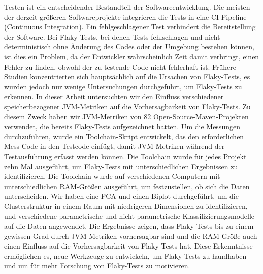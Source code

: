 \documentclass{seal_thesis}
\begin{document}
\begin{zusammenfassung}
Testen ist ein entscheidender Bestandteil der Softwareentwicklung. Die meisten der derzeit größeren Softwareprojekte integrieren die Tests in eine CI-Pipeline (Continuous Integration). Ein fehlgeschlagener Test verhindert die Bereitstellung der Software. Bei Flaky-Tests, bei denen Tests fehlschlagen und nicht deterministisch ohne Änderung des Codes oder der Umgebung bestehen können, ist dies ein Problem, da der Entwickler wahrscheinlich Zeit damit verbringt, einen Fehler zu finden, obwohl der zu testende Code nicht fehlerhaft ist. Frühere Studien konzentrierten sich hauptsächlich auf die Ursachen von Flaky-Tests, es wurden jedoch nur wenige Untersuchungen durchgeführt, um Flaky-Tests zu erkennen. In dieser Arbeit untersuchten wir den Einfluss verschiedener speicherbezogener JVM-Metriken auf die Vorhersagbarkeit von Flaky-Tests. Zu diesem Zweck haben wir JVM-Metriken von 82 Open-Source-Maven-Projekten verwendet, die bereits Flaky-Tests aufgezeichnet hatten. Um die Messungen durchzuführen, wurde ein Toolchain-Skript entwickelt, das den erforderlichen Mess-Code in den Testcode einfügt, damit JVM-Metriken während der Testausführung erfasst werden können. Die Toolchain wurde für jedes Projekt zehn Mal ausgeführt, um Flaky-Tests mit unterschiedlichen Ergebnissen zu identifizieren. Die Toolchain wurde auf verschiedenen Computern mit unterschiedlichen RAM-Größen ausgeführt, um festzustellen, ob sich die Daten unterscheiden. Wir haben eine PCA und einen Biplot durchgeführt, um die Clusterstruktur in einem Raum mit niedrigeren Dimensionen zu identifizieren, und verschiedene parametrische und nicht parametrische Klassifizierungsmodelle auf die Daten angewendet. Die Ergebnisse zeigen, dass Flaky-Tests bis zu einem gewissen Grad durch JVM-Metriken vorhersagbar sind und die RAM-Größe auch einen Einfluss auf die Vorhersagbarkeit von Flaky-Tests hat. Diese Erkenntnisse ermöglichen es, neue Werkzeuge zu entwickeln, um Flaky-Tests zu handhaben und um für mehr Forschung von Flaky-Tests zu motivieren.
\end{zusammenfassung}

\tableofcontents
\listoffigures
\listoftables
\lstlistoflistings

\mainmatter
\end{document}
